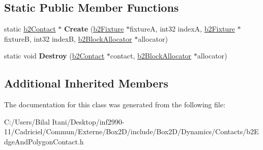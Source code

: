 \subsection*{Static Public Member Functions}
\begin{DoxyCompactItemize}
\item 
static \hyperlink{classb2_contact}{b2\+Contact} $\ast$ {\bfseries Create} (\hyperlink{classb2_fixture}{b2\+Fixture} $\ast$fixtureA, int32 indexA, \hyperlink{classb2_fixture}{b2\+Fixture} $\ast$fixtureB, int32 indexB, \hyperlink{classb2_block_allocator}{b2\+Block\+Allocator} $\ast$allocator)\hypertarget{classb2_edge_and_polygon_contact_a43c450ab34c63cb7dca91ed04a6bacaf}{}\label{classb2_edge_and_polygon_contact_a43c450ab34c63cb7dca91ed04a6bacaf}

\item 
static void {\bfseries Destroy} (\hyperlink{classb2_contact}{b2\+Contact} $\ast$contact, \hyperlink{classb2_block_allocator}{b2\+Block\+Allocator} $\ast$allocator)\hypertarget{classb2_edge_and_polygon_contact_aefebb57eb58fa87a609033b0d4991a66}{}\label{classb2_edge_and_polygon_contact_aefebb57eb58fa87a609033b0d4991a66}

\end{DoxyCompactItemize}
\subsection*{Additional Inherited Members}


The documentation for this class was generated from the following file\+:\begin{DoxyCompactItemize}
\item 
C\+:/\+Users/\+Bilal Itani/\+Desktop/inf2990-\/11/\+Cadriciel/\+Commun/\+Externe/\+Box2\+D/include/\+Box2\+D/\+Dynamics/\+Contacts/b2\+Edge\+And\+Polygon\+Contact.\+h\end{DoxyCompactItemize}
